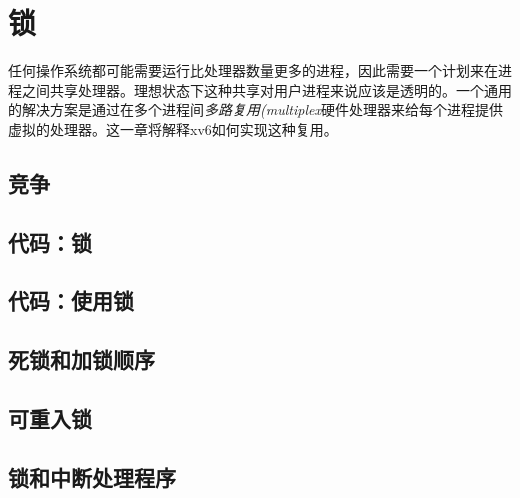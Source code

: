 \chapter{锁}\label{ch06}

任何操作系统都可能需要运行比处理器数量更多的进程，因此需要一个计划来在进程之间共享处理器。理想状态下这种共享对用户进程来说应该是透明的。一个通用的解决方案是通过在多个进程间\emph{多路复用(multiplex}硬件处理器来给每个进程提供虚拟的处理器。这一章将解释xv6如何实现这种复用。

\section{竞争}

\section{代码：锁}

\section{代码：使用锁}

\section{死锁和加锁顺序}

\section{可重入锁}

\section{锁和中断处理程序}\label{s6-6}
